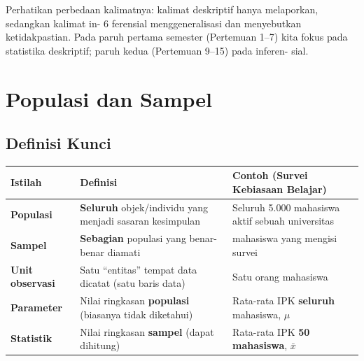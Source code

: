 \documentclass[
  indonesian,
  letterpaper,
]{book}
\newcounter{none} %
\begin{document}
Perhatikan perbedaan kalimatnya: kalimat deskriptif hanya melaporkan,
sedangkan kalimat in- 6 ferensial menggeneralisasi dan menyebutkan
ketidakpastian. Pada paruh pertama semester (Pertemuan 1--7) kita fokus
pada statistika deskriptif; paruh kedua (Pertemuan 9--15) pada inferen-
sial.

\section{Populasi dan Sampel}\label{populasi-dan-sampel}

\subsection{Definisi Kunci}\label{definisi-kunci}

{\def\LTcaptype{none} %
\begin{longtable}[]{@{}
  >{\raggedright\arraybackslash}p{}
  >{\raggedright\arraybackslash}p{}
  >{\raggedright\arraybackslash}p{}@{}}
\toprule\noalign{}
\begin{minipage}[b]{\linewidth}\raggedright
Istilah
\end{minipage} & \begin{minipage}[b]{\linewidth}\raggedright
Definisi
\end{minipage} & \begin{minipage}[b]{\linewidth}\raggedright
Contoh (Survei Kebiasaan Belajar)
\end{minipage} \\
\midrule\noalign{}
\endhead
\bottomrule\noalign{}
\endlastfoot
\textbf{Populasi} & \textbf{Seluruh} objek/individu yang menjadi sasaran
kesimpulan & Seluruh 5.000 mahasiswa aktif sebuah universitas \\
\textbf{Sampel} & \textbf{Sebagian} populasi yang benar-benar diamati &
50 mahasiswa yang mengisi survei \\
\textbf{Unit observasi} & Satu ``entitas'' tempat data dicatat (satu
baris data) & Satu orang mahasiswa \\
\textbf{Parameter} & Nilai ringkasan \textbf{populasi} (biasanya tidak
diketahui) & Rata-rata IPK \textbf{seluruh} mahasiswa, \(\mu\) \\
\textbf{Statistik} & Nilai ringkasan \textbf{sampel} (dapat dihitung) &
Rata-rata IPK \textbf{50 mahasiswa}, \(\bar{x}\) \\
\end{longtable}
}
\end{document}
